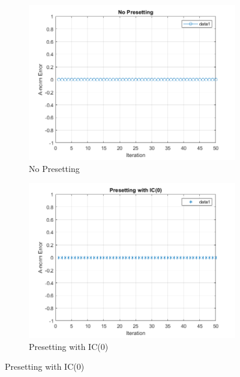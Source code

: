\begin{figure}[h]
    \centering
    \begin{subfigure}{0.48\textwidth}
        \includegraphics[width=\textwidth]{Chapters/no preseting.png}
        \caption{No Presetting}
        \label{subfig:no_presetting}
    \end{subfigure}
    \hfill
    \begin{subfigure}{0.48\textwidth}
        \includegraphics[width=\textwidth]{Chapters/preseting ic(0).png}
        \caption{Presetting with IC(0)}
        \label{subfig:presetting_ic0}
    \end{subfigure}
    

\end{figure}
